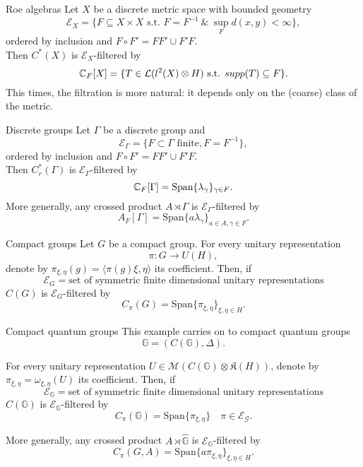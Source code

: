 \begin{frame}{Roe algebras}
Let $X$ be a discrete metric space with bounded geometry
\[\mathcal E_X = \{F\subseteq X\times X \text{ s.t. } F= F^{-1} \ \& \ \sup_{F} d(x,y) < \infty	\},\]
ordered by inclusion and $F\circ F' = FF' \cup F'F$.\\
 \vspace{0.4in}
Then $C^*(X)$ is $\mathcal E_{X}$-filtered by  
\[\mathbb C_F [X] = \{ T\in \mathcal L(l^2(X)\otimes H) \text{ s.t. } supp(T)\subseteq F\}	.\]
This times, the filtration is more natural: it depends only on the (coarse) class of the metric.
\end{frame}

\begin{frame}{Discrete groups}
Let $\Gamma$ be a discrete group and
\[\mathcal E_\Gamma = \{F\subset \Gamma \text{ finite} , F= F^{-1}\},\]
ordered by inclusion and $F\circ F' = FF' \cup F'F$.\\
 \vspace{0.4in}
Then $C_r^*(\Gamma)$ is $\mathcal E_{\Gamma}$-filtered by  
\[\mathbb C_F [\Gamma] = \text{Span} \{ \lambda_\gamma\}_{\gamma \in F}.\]
More generally, any crossed product $A\rtimes \Gamma$ is $\mathcal E_{\Gamma}$-filtered by
\[A_F[\Gamma]= \text{Span} \{ a\lambda_\gamma\}_{a \in A ,\gamma \in F}.\]
\end{frame}

\begin{frame}{Compact groups}
Let $G$ be a compact group. For every unitary representation 
\[\pi : G \rightarrow U(H), \] 
denote by $\pi_{\xi,\eta}(g) =\langle \pi(g)\xi ,\eta\rangle$ its coefficient. Then, if 
\[ \mathcal E_G = \text{set of symmetric finite dimensional unitary representations} \]
$C(G)$ is $\mathcal E_G$-filtered by  
\[C_\pi (G) = \text{Span} \{ \pi_{\xi ,\eta}\}_{\xi,\eta\in H}.\]
\end{frame}

\begin{frame}{Compact quantum groups}
This example carries on to compact quantum groups \[\mathbb G = (C(\mathbb G),\Delta).\] 

For every unitary representation $U \in \mathcal M (C(\mathbb G)\otimes \mathfrak K(H))$, denote by $\pi_{\xi,\eta}=\omega_{\xi,\eta} (U)$ its coefficient. Then, if 
\[ \mathcal E_{\mathbb G} = \text{set of symmetric finite dimensional unitary representations} \]
$C(\mathbb G)$ is $\mathcal E_{\mathbb G}$-filtered by  
\[C_\pi (\mathbb G) = \text{Span} \{ \pi_{\xi ,\eta}\} \quad \pi \in \mathcal E_{\mathcal G}.\]

More generally, any crossed product $A\rtimes \hat {\mathbb G}$ is $\mathcal E_{\mathbb G}$-filtered by
\[C_\pi (G,A) = \text{Span} \{ a \pi_{\xi ,\eta}\}_{\xi,\eta\in H}.\]
\end{frame}

